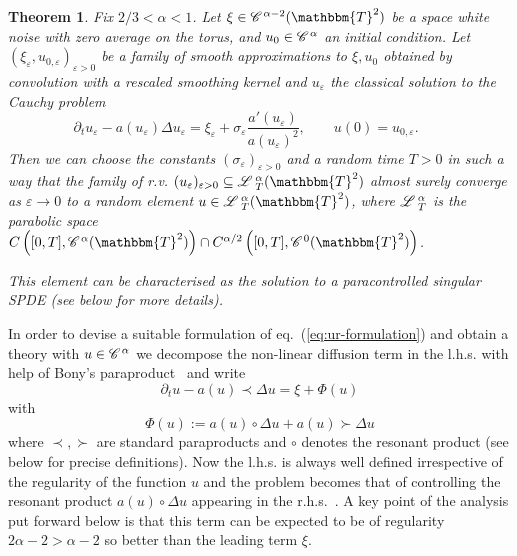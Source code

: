 \documentclass[11pt,reqno]{amsart}
\newcommand{\assign}{:=}
\newtheorem{theorem}{Theorem}
\newcommand{\CC}{\mathscr{C} \hspace{.1em}}
\newcommand{\LL}{\mathscr{L} \hspace{.2em}}
\begin{document}
\begin{theorem}
  Fix $2 / 3 < \alpha < 1$. Let $\xi \in \CC^{\alpha - 2} (\mathbbm{T}^2)$ be
  a space white noise with zero average on the torus, and $u_0 \in
  \CC^{\alpha}$ an initial condition. Let $(\xi_{\varepsilon}, u_{0,
  \varepsilon})_{\varepsilon > 0}$ be a family of smooth approximations to
  $\xi, u_0$ obtained by convolution with a rescaled smoothing kernel and
  $u_{\varepsilon}$ the classical solution to the Cauchy problem
  \begin{equation}
    \partial_t u_{\varepsilon} - a (u_{\varepsilon}) \Delta u_{\varepsilon} =
    \xi_{\varepsilon} + \sigma_{\varepsilon} \frac{a' (u_{\varepsilon})}{a
    (u_{\varepsilon})^2}, \qquad u (0) = u_{0, \varepsilon} . \qquad
    \label{eq:ur-formulation-approx}
  \end{equation}
  Then we can choose the constants $(\sigma_{\varepsilon})_{\varepsilon > 0}$
  and a random time $T > 0$ in such a way that the family of r.v.
  $(u_{\varepsilon})_{\varepsilon > 0} \subseteq \LL_T^{\alpha}
  (\mathbbm{T}^2)$ almost surely converge as $\varepsilon \rightarrow 0$ to a
  random element $u \in \LL_T^{\alpha} (\mathbbm{T}^2)$, where
  $\LL_T^{\alpha}$ is the parabolic space $C \left( [0, T], \CC^{\alpha}
  (\mathbbm{T}^2) \right) \cap C^{\alpha / 2} \left( [0, T], \CC^0
  (\mathbbm{T}^2) \right)$.
  
  This element can be characterised as the solution to a paracontrolled
  singular SPDE (see below for more details).
\end{theorem}

In order to devise a suitable formulation of eq.~(\ref{eq:ur-formulation}) and
obtain a theory with $u \in \CC^{\alpha}$ we decompose the non-linear
diffusion term in the l.h.s. with help of Bony's
paraproduct~{\cite{meyer_remarques_1981}} and write
\begin{equation}
  \partial_t u - a (u) \prec \Delta u = \xi + \Phi (u)
  \label{e:paracontrolled-eq}
\end{equation}
with
\begin{equation}
  \Phi (u) \assign a (u) \circ \Delta u + a (u) \succ \Delta u
  \label{e:def-Phi}
\end{equation}
where $\prec, \succ$ are standard paraproducts and $\circ$ denotes the
resonant product (see below for precise definitions). Now the l.h.s. is always
well defined irrespective of the regularity of the function $u$ and the
problem becomes that of controlling the resonant product $a (u) \circ \Delta
u$ appearing in the r.h.s.~. A key point of the analysis put forward below is
that this term can be expected to be of regularity $2 \alpha - 2 > \alpha - 2$
so better than the leading term $\xi$.
\end{document}
